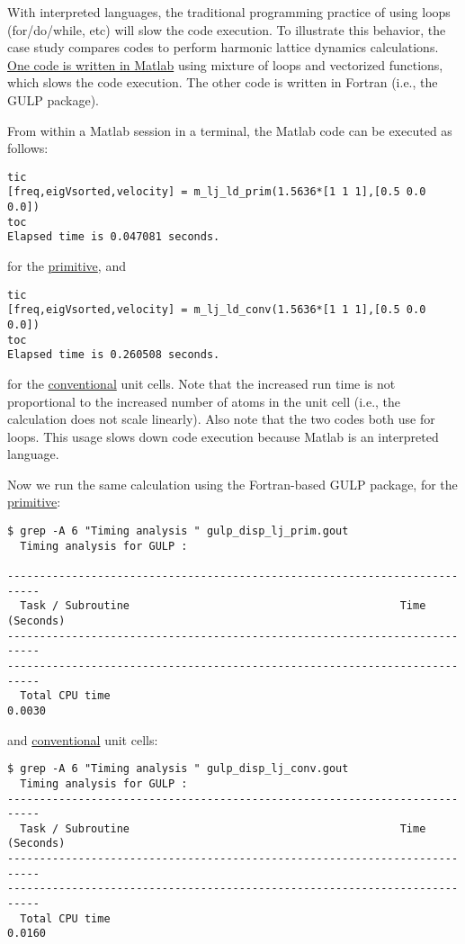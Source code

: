 With interpreted languages, the traditional programming practice of using 
loops (for/do/while, etc) will slow the code execution.  To illustrate 
this behavior, the case study compares codes to perform harmonic lattice 
dynamics calculations. 
\href{https://github.com/jasonlarkin/disorder/blob/master/matlab/m_lj_ld_prim.m}
{One code is written in Matlab} using mixture of loops 
and vectorized functions, which slows the code execution. The other 
code is written in Fortran (i.e., the GULP package). 

From within a Matlab session in a terminal, the Matlab code can be 
executed as follows:
\begin{lstlisting}
tic
[freq,eigVsorted,velocity] = m_lj_ld_prim(1.5636*[1 1 1],[0.5 0.0 0.0])
toc
Elapsed time is 0.047081 seconds.
\end{lstlisting}
for the 
\href{https://github.com/jasonlarkin/disorder/blob/master/matlab/m_lj_ld_prim.m}
{primitive}, and
\begin{lstlisting}
tic
[freq,eigVsorted,velocity] = m_lj_ld_conv(1.5636*[1 1 1],[0.5 0.0 0.0])
toc
Elapsed time is 0.260508 seconds.
\end{lstlisting}
for the 
\href{https://github.com/jasonlarkin/disorder/blob/master/matlab/m_lj_ld_conv.m}
{conventional} unit cells. Note that the increased run time is not 
proportional to the increased number of atoms in the unit cell (i.e., 
the calculation does not scale linearly). 
Also note that the two codes both use for loops. This usage slows down code 
execution because Matlab is an interpreted language. 

Now we run the same calculation using the Fortran-based GULP package, for 
the 
\href{https://github.com/jasonlarkin/disorder/blob/master/matlab/gulp_disp_lj_prim.gin}
{primitive}:
\begin{lstlisting}
$ grep -A 6 "Timing analysis " gulp_disp_lj_prim.gout
  Timing analysis for GULP :

---------------------------------------------------------------------------
  Task / Subroutine                                          Time (Seconds)
---------------------------------------------------------------------------
---------------------------------------------------------------------------
  Total CPU time                                                  0.0030
\end{lstlisting}
and 
\href{https://github.com/jasonlarkin/disorder/blob/master/matlab/gulp_disp_lj_conv.gin}
{conventional} unit cells:
\begin{lstlisting}
$ grep -A 6 "Timing analysis " gulp_disp_lj_conv.gout
  Timing analysis for GULP :
---------------------------------------------------------------------------
  Task / Subroutine                                          Time (Seconds)
---------------------------------------------------------------------------
---------------------------------------------------------------------------
  Total CPU time                                                  0.0160
\end{lstlisting}

